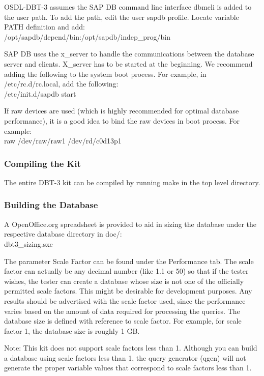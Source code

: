 \documentclass{article}
\begin{document}
\noindent
OSDL-DBT-3 assumes the SAP DB command line interface dbmcli is added
to the user path.  To add the path, edit the user sapdb profile.
Locate variable PATH definition and add: \\
\indent /opt/sapdb/depend/bin:/opt/sapdb/indep\_prog/bin

\noindent
SAP DB uses the x\_server to handle the communications between the
database server and clients.  X\_server has to be started at the
beginning.  We recommend adding the following to the system boot
process.  For example,  in /etc/rc.d/rc.local, add the following: \\
\indent /etc/init.d/sapdb start

\noindent
If raw devices are used (which is highly recommended for optimal
database performance),  it is a good idea to bind the raw devices in
boot process.  For example: \\
\indent raw   /dev/raw/raw1    /dev/rd/c0d13p1

\subsubsection{Compiling the Kit}

\noindent
The entire DBT-3 kit can be compiled by running make in the top
level directory.

\subsubsection{Building the Database}

\noindent
A OpenOffice.org spreadsheet is provided to aid in sizing the
database under the respective database directory in doc/: \\
\indent dbt3\_sizing.sxc

\noindent
The parameter Scale Factor can be found under the Performance tab.
The scale factor can actually be any decimal number (like 1.1 or 50)
so that if the tester wishes,  the tester can create a database whose
size is not one of the officially permitted scale factors.  This
might be desirable for development purposes.  Any results should be
advertised with the scale factor used, since the performance varies
based on the amount of data required for processing the queries.  The
database size is defined with reference to scale factor.  For
example, for scale factor 1, the database size is roughly 1 GB.

\noindent
Note:  This kit does not support scale factors less than 1.  Although
you can build a database using scale factors less than 1, the query
generator (qgen) will not generate the proper variable values that
correspond to scale factors less than 1.
\end{document}
